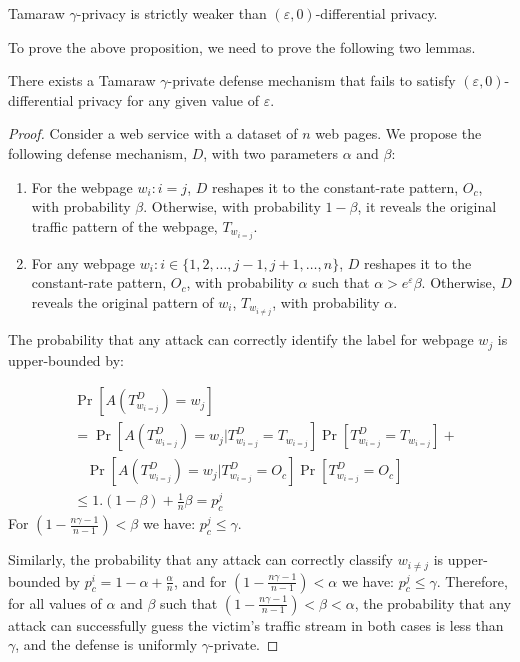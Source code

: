\begin{proposition}
  Tamaraw $\gamma$-privacy is strictly weaker than $(\varepsilon, 0)$-differential privacy.
\end{proposition}
To prove the above proposition, we need to prove the following two lemmas.
\begin{lemma-numbered}
  There exists a Tamaraw $\gamma$-private defense mechanism that fails to satisfy $(\varepsilon, 0)$-differential privacy for any given value of $\varepsilon$.
\end{lemma-numbered}
\begin{proof}
    Consider a web service with a dataset of $n$ web pages.
    We propose the following defense mechanism, $D$, with two parameters $\alpha$ and $\beta$:
    \begin{enumerate}
    \item For the webpage $w_i: i=j$, $D$ reshapes it to the constant-rate pattern, $O_c$, with probability $\beta$. Otherwise, with probability $1-\beta$, it reveals the original traffic pattern of the webpage, $T_{w_{i=j}}$.
    \item For any webpage $w_i: i \in \{1, 2, \dots, j-1, j+1, \dots, n\}$, $D$ reshapes it to the constant-rate pattern, $O_c$, with probability $\alpha$ such that $\alpha > {e^{\varepsilon}}\beta$. Otherwise, $D$ reveals the original pattern of $w_i$, $T_{w_{i\neq j}}$, with probability $\alpha$.
    \end{enumerate}
    The probability that any attack can correctly identify the label for webpage $w_j$ is upper-bounded by:

    \begin{align*}
      & \Pr[A(T^{D}_{w_{i=j}}) = w_j]
      \\
      & = \Pr[A(T^D_{w_{i=j}}) = w_j | T^D_{w_{i=j}}=T_{w_{i=j}}]\Pr[T^D_{w_{i=j}}=T_{w_{i=j}}] +
      \\
      &~~~~\Pr[A(T^D_{w_{i=j}}) = w_j | T^D_{w_{i=j}}=O_c]\Pr[T^D_{w_{i=j}}=O_c]
      \\
      & \leq  1.(1-\beta) + \frac{1}{n}\beta = p_c^j
    \end{align*}
    For $(1- \frac{n\gamma - 1}{n-1}) < \beta$ we have: $p_c^j \leq \gamma$.

    Similarly, the probability that any attack can correctly classify $w_{i\neq j}$ is upper-bounded by $p_c^i = 1-\alpha + \frac{\alpha}{n}$, and for $(1- \frac{n\gamma - 1}{n-1}) < \alpha$ we have: $p_c^j \leq \gamma$.
    Therefore, for all values of $\alpha$ and $\beta$ such that $(1- \frac{n\gamma -
    1}{n-1}) < \beta < \alpha$, the probability that any attack can successfully
    guess the victim's traffic stream in both cases is less than $\gamma$, and
    the defense is uniformly $\gamma$-private.


\end{proof}
